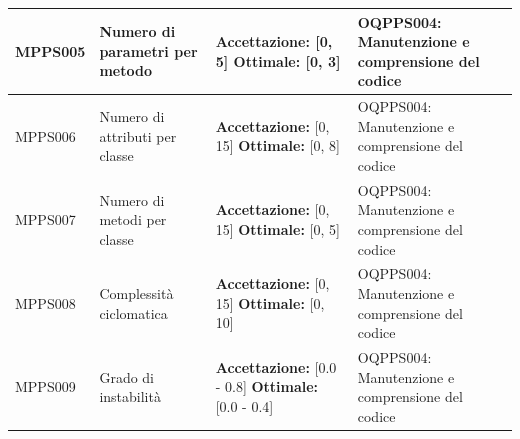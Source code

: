\documentclass[openany,12pt,a4paper]{report}
\begin{document}
\begin{longtable}{| p{2cm} | p{3.5cm} |p{5.5cm} | p{5.5cm} |}
		\hline
		
		\newline MPPS005 &
		\newline Numero di parametri per metodo &
		\newline \textbf{Accettazione:} [0, 5]
		\newline \textbf{Ottimale:} [0, 3] &
		\newline OQPPS004: Manutenzione e comprensione del codice
		\\[1em]
		
		\hline
		
		\newline MPPS006 &
		\newline Numero di attributi per classe &
		\newline \textbf{Accettazione:} [0, 15] 
		\newline \textbf{Ottimale:} [0, 8] &
		\newline OQPPS004: Manutenzione e comprensione del codice
		\\[1em]
		
		\hline
		
		\newline MPPS007 &
		\newline Numero di metodi per classe &
		\newline \textbf{Accettazione:} [0, 15] 
		\newline \textbf{Ottimale:} [0, 5] &
		\newline OQPPS004: Manutenzione e comprensione del codice 
		\\[1em]
		
		\hline
		
		\newline MPPS008 &
		\newline Complessità ciclomatica &
		\newline \textbf{Accettazione:} [0, 15] 
		\newline \textbf{Ottimale:} [0, 10] &
		\newline OQPPS004: Manutenzione e comprensione del codice 
		\\[1em]
		
		\hline
		
		\newline MPPS009 &
		\newline Grado di instabilità &
		\newline \textbf{Accettazione:} [0.0 - 0.8] 
		\newline \textbf{Ottimale:} [0.0 - 0.4]&
		\newline OQPPS004: Manutenzione e comprensione del codice 
		\\[1em]
		

\end{longtable}
\end{document}
